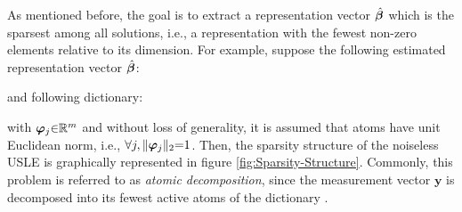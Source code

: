 As mentioned before, the goal is to extract a representation vector $\hat{\boldsymbol{\beta}}$ which is the sparsest among all solutions, i.e., a representation with the fewest non-zero elements relative to its dimension.
For example, suppose the following estimated representation vector $\hat{\boldsymbol{\beta}}$:

and following dictionary:

with $\boldsymbol{\varphi}_{j} {\in} \mathbb{R}^{m}$ and without loss of generality, it is assumed that atoms have unit Euclidean norm, i.e., $\forall j,  \Vert \boldsymbol{\varphi}_{j} \Vert_2 {=} 1$.
Then, the sparsity structure of the noiseless USLE 
is graphically represented in figure \ref{fig:Sparsity-Structure}.
Commonly, this problem is referred to as \emph{atomic decomposition}, since the measurement vector $\boldsymbol{y}$ is decomposed into its fewest active 
atoms of the dictionary \cite{Chen2001,Donoho2001,Donoho2003a}.

\FloatBarrier